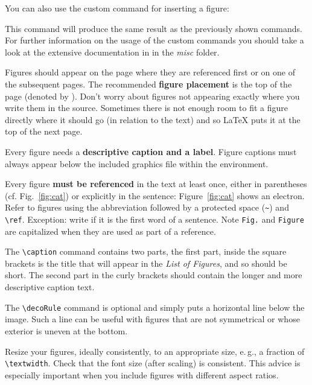 You can also use the custom command  for inserting a figure:

\begin{latex}
\end{latex}

This command will produce the same result as the previously shown commands.
For further information on the usage of the custom commands you should take a look at the extensive documentation in  in the \emph{misc} folder.

Figures should appear on the page where they are referenced first or on one of the subsequent pages. The recommended \textbf{figure placement} is the top of the page (denoted by \code{[t]}). Don't worry about figures not appearing exactly where you write them in the source. Sometimes there is not enough room to fit a figure directly where it should go (in relation to the text) and so LaTeX puts it at the top of the next page.

Every figure needs a \textbf{descriptive caption and a label}. Figure captions must always appear below the included graphics file within the  environment.

Every figure \textbf{must be referenced} in the text at least once, either in parentheses (cf. Fig.~\ref{fig:cat}) or explicitly in the sentence: Figure~\ref{fig:cat} shows an electron. Refer to figures using the abbreviation  followed by a protected space (\verb|~|) and \verb|\ref|. Exception: write  if it is the first word of a sentence. Note \verb|Fig.| and \verb|Figure| are capitalized when they are used as part of a reference.

The \verb|\caption| command contains two parts,
the first part, inside the square brackets%
is the title that will appear in the \emph{List of Figures}, and so should be short.
 The second part in the curly brackets should contain the longer and more descriptive caption text.

The \verb|\decoRule| command is optional and simply puts a horizontal line below the image. Such a line can be useful with figures that are not symmetrical or whose exterior is uneven at the bottom.

Resize your figures, ideally consistently, to an appropriate size, e.\,g., a fraction of \texttt{\textbackslash textwidth}. Check that the font size (after scaling) is consistent. This advice is especially important when you include figures with different aspect ratios.

